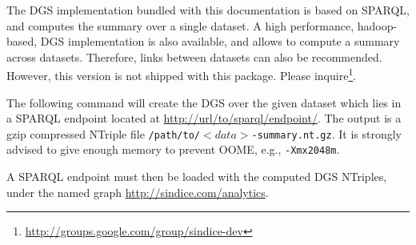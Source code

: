 
The DGS implementation bundled with this documentation is based on SPARQL, and computes the summary over a single dataset. A high performance, hadoop-based, DGS implementation is also available, and allows to compute a summary across datasets. Therefore, links between datasets can also be recommended. However, this version is not shipped with this package. Please inquire\footnote{\url{http://groups.google.com/group/sindice-dev}}.

The following command will create the DGS over the given dataset which lies in a SPARQL endpoint located at \url{http://url/to/sparql/endpoint/}. The output is a gzip compressed NTriple file \texttt{/path/to/\mbox{$<\!data\!>$}-summary.nt.gz}. It is strongly advised to give enough memory to prevent OOME, e.g., \texttt{-Xmx2048m}.

\bigskip
\begin{raggedleft}
\end{raggedleft}
\hfill

A SPARQL endpoint must then be loaded with the computed DGS NTriples, under the named graph \url{http://sindice.com/analytics}.

